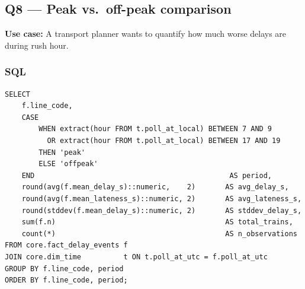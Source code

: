 \documentclass[a4paper,11pt]{article}
\begin{document}
\begin{table}[H]
\centering
\small
{}%
\caption{Q7 sample output: top 5 stations by average lateness, RER A, March 2026.
  All are western-branch terminus stations, reflecting their distance from Paris.}
\end{table}


\subsection{Q8 --- Peak vs.\ off-peak comparison}

\textbf{Use case:} A transport planner wants to quantify how much
worse delays are during rush hour.

\subsubsection{SQL}

\begin{lstlisting}[style=sql, caption={Q8 --- peak vs.\ off-peak
  (\texttt{sql/queries/q8\_peak\_vs\_offpeak.sql}).}]
SELECT
    f.line_code,
    CASE
        WHEN extract(hour FROM t.poll_at_local) BETWEEN 7 AND 9
          OR extract(hour FROM t.poll_at_local) BETWEEN 17 AND 19
        THEN 'peak'
        ELSE 'offpeak'
    END                                              AS period,
    round(avg(f.mean_delay_s)::numeric,    2)       AS avg_delay_s,
    round(avg(f.mean_lateness_s)::numeric, 2)       AS avg_lateness_s,
    round(stddev(f.mean_delay_s)::numeric, 2)       AS stddev_delay_s,
    sum(f.n)                                        AS total_trains,
    count(*)                                        AS n_observations
FROM core.fact_delay_events f
JOIN core.dim_time          t ON t.poll_at_utc = f.poll_at_utc
GROUP BY f.line_code, period
ORDER BY f.line_code, period;
\end{lstlisting}
\end{document}
